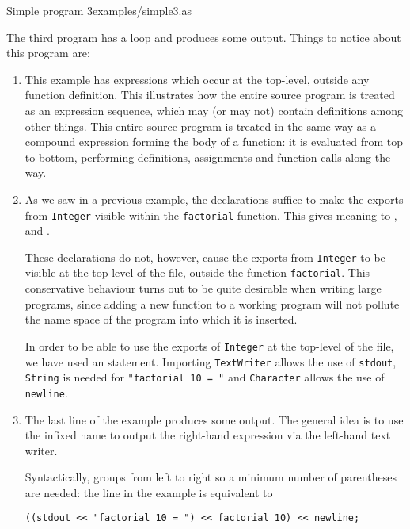 {}
{Simple program 3}{examples/simple3.as}

The third program
has a loop and produces some output.  Things to notice about
this program are:
\begin{enumerate}

\item This example has expressions which occur at the top-level,
outside any function definition.  This illustrates how the entire source
program is treated as an expression sequence, which may (or may not) contain
definitions among other things.  
This entire source program is treated in the same way as a compound
expression forming the body of a function:  it is evaluated from 
top to bottom, performing definitions, assignments and function calls
along the way.

\item As we saw in a previous example,
the declarations  suffice
to make the exports from \verb"Integer" visible within the
\verb"factorial" function.
This gives meaning to , \ttin{*} and .

These declarations do not, however, cause 
the exports from \verb"Integer" to be visible at the top-level
of the file, outside the function \verb"factorial".
This conservative behaviour turns out to be quite desirable when
writing large programs, since adding a new function to a working
program will not pollute the name space of the program into which it
is inserted.

In order to be able to use the exports of \verb"Integer" at the 
top-level of the file, we have used an  statement.
Importing \verb+TextWriter+ allows the use of \verb+stdout+,
\verb+String+ is needed for \verb+"factorial 10 = "+ and
\verb+Character+ allows the use of \verb+newline+.

\item The last line of the example produces some output.
The general idea is to use the infixed name \ttin{<<} to
output the right-hand expression via the left-hand text writer.

Syntactically, \ttin{<<} groups from left to right so a minimum number
of parentheses are needed:  the line in the example is equivalent to

\begin{small}
\begin{verbatim}
((stdout << "factorial 10 = ") << factorial 10) << newline;
\end{verbatim}
\end{small}


\end{enumerate}

